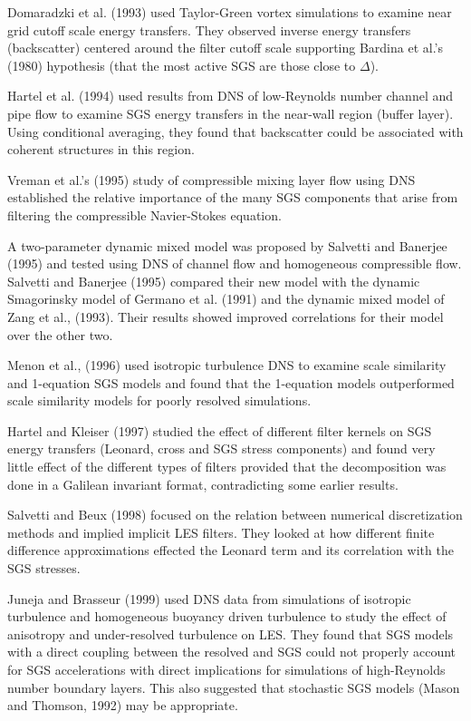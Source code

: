 \documentclass[11pt]{article}
\begin{document}
Domaradzki et al. (1993) used Taylor-Green vortex simulations to examine near grid cutoff scale energy transfers.  They observed inverse energy transfers (backscatter) centered around the filter cutoff scale supporting Bardina et al.'s (1980) hypothesis (that the most active SGS are those close to $\Delta$). 

Hartel et al. (1994) used results from DNS of low-Reynolds number channel and pipe flow to examine SGS energy transfers in the near-wall region (buffer layer).  Using conditional averaging, they found that backscatter could be associated with coherent structures in this region.  

Vreman et al.'s (1995) study of compressible mixing layer flow using DNS established the relative importance of the many SGS components that arise from filtering the compressible Navier-Stokes equation.  

A two-parameter dynamic mixed model was proposed by Salvetti and Banerjee (1995) and tested using DNS of channel flow and homogeneous compressible flow. Salvetti and Banerjee (1995) compared their new model with the dynamic Smagorinsky model of Germano et al. (1991) and the dynamic mixed model of Zang et al., (1993).  Their results showed improved correlations for their model over the other two.  

Menon et al., (1996) used isotropic turbulence DNS to examine scale similarity and 1-equation SGS models and found that the 1-equation models outperformed scale similarity models for poorly resolved simulations. 

Hartel and Kleiser (1997) studied the effect of different filter kernels on SGS energy transfers (Leonard, cross and SGS stress components) and found very little effect of the different types of filters provided that the decomposition was done in a Galilean invariant format, contradicting some earlier results. 

Salvetti and Beux (1998) focused on the relation between numerical discretization methods and implied implicit LES filters. They looked at how different finite difference approximations effected the Leonard term and its correlation with the SGS stresses.  

Juneja and Brasseur (1999) used DNS data from simulations of isotropic turbulence and homogeneous buoyancy driven turbulence to study the effect of anisotropy and under-resolved turbulence on LES.  They found that SGS models with a direct coupling between the resolved and SGS could not properly account for SGS accelerations with direct implications for simulations of high-Reynolds number boundary layers. This also suggested that stochastic SGS models  (Mason and Thomson, 1992) may be appropriate. 
\end{document}
